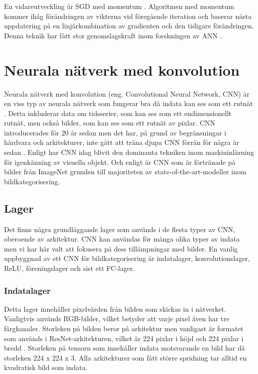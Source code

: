 \documentclass[]{kththesis}
\begin{document}
En vidareutveckling är SGD med momentum \parencite{qian1999momentum}. Algoritmen med momentum kommer ihåg förändringen av vikterna vid föregående iteration och baserar nästa uppdatering på en linjärkombination av gradienten och den tidigare förändringen. Denna teknik har fått stor genomslagskraft inom forskningen av ANN \parencite{sutskever2013importance}.

\section{Neurala nätverk med konvolution}
Neurala nätverk med konvolution (eng. Convolutional Neural Network, CNN) är en viss typ av neurala nätverk som fungerar bra då indata kan ses som ett rutnät \parencite{Goodfellow-et-al-2016}. Detta inkluderar data om tidsserier, som kan ses som ett endimensionellt rutnät, men också bilder, som kan ses som ett rutnät av pixlar. CNN introducerades för 20 år sedan men det har, på grund av begränsningar i hårdvara och arkitekturer, inte gått att träna djupa CNN förrän för några år sedan \parencite{huang2017densely}. Enligt \textcite{huang2017densely} har CNN idag blivit den dominanta tekniken inom maskininlärning för igenkänning av visuella objekt. Och enligt \textcite{simon2016imagenet} är CNN som är förtränade på bilder från ImageNet grunden till majoriteten av state-of-the-art-modeller inom bildkategorisering.

\subsection{Lager}
Det finns några grundläggande lager som används i de flesta typer av CNN, oberoende av arkitektur. CNN kan användas för många olika typer av indata men vi har här valt att fokusera på dess tillämpningar med bilder. En vanlig uppbyggnad av ett CNN för bildkategorisering är indatalager, konvolutionslager, ReLU, föreningslager och sist ett FC-lager.

\subsubsection{Indatalager}
Detta lager innehåller pixelvärden från bilden som skickas in i nätverket. Vanligtvis används RGB-bilder, vilket betyder att varje pixel även har tre färgkanaler. Storleken på bilden beror på arkitektur men vanligast är formatet som används i ResNet-arkitekturen, vilket är 224 pixlar i höjd och 224 pixlar i bredd \parencite{krizhevsky2012imagenet}. Storleken på tensorn som innehåller indata motsvarande en bild har då storleken 224 x 224 x 3. Alla arkitekturer som fått större spridning tar alltid en kvadratisk bild som indata.
\end{document}
